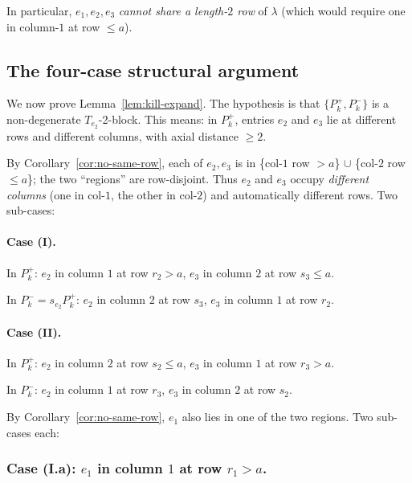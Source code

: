 \documentclass[11pt]{article}
\theoremstyle{definition}
\begin{document}
In particular, $e_1,e_2,e_3$ \emph{cannot share a length-$2$ row}
of $\lambda$ (which would require one in column-$1$ at row $\le a$).

\subsection{The four-case structural argument}\label{sec:four-cases}

We now prove Lemma~\ref{lem:kill-expand}.  The hypothesis is that
$\{P_k^+,P_k^-\}$ is a non-degenerate $T_{e_2}$-2-block.  This means:
in $P_k^+$, entries $e_2$ and $e_3$ lie at different rows and
different columns, with axial distance $\ge 2$.

By Corollary~\ref{cor:no-same-row}, each of $e_2,e_3$ is in
\{col-$1$ row $>a$\} $\cup$ \{col-$2$ row $\le a$\}; the two
``regions'' are row-disjoint.  Thus $e_2$ and $e_3$ occupy
\emph{different columns} (one in col-$1$, the other in col-$2$) and
automatically different rows.  Two sub-cases:

\paragraph{Case (I).}  In $P_k^+$: $e_2$ in column $1$ at row
$r_2>a$, $e_3$ in column $2$ at row $s_3\le a$.

In $P_k^-=s_{e_2}P_k^+$: $e_2$ in column $2$ at row $s_3$, $e_3$ in
column $1$ at row $r_2$.

\paragraph{Case (II).}  In $P_k^+$: $e_2$ in column $2$ at row
$s_2\le a$, $e_3$ in column $1$ at row $r_3>a$.

In $P_k^-$: $e_2$ in column $1$ at row $r_3$, $e_3$ in column $2$ at
row $s_2$.

\medskip

\noindent
By Corollary~\ref{cor:no-same-row}, $e_1$ also lies in one of the
two regions.  Two sub-cases each:

\subsubsection*{Case (I.a):  $e_1$ in column $1$ at row $r_1>a$.}
\end{document}
